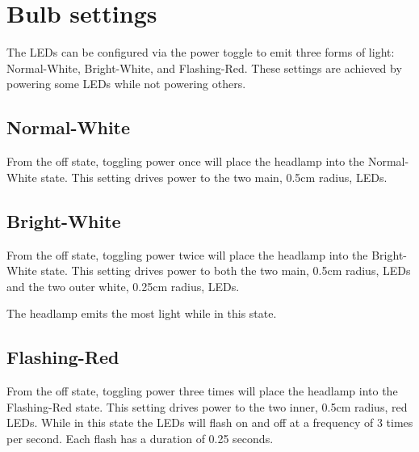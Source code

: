 \documentclass[12pt]{article}
\begin{document}
\section{Bulb settings}
The LEDs can be configured via the power toggle to emit three forms of light: Normal-White,
Bright-White, and Flashing-Red. These settings are achieved by powering some LEDs while not
powering others.

\subsection{Normal-White}
From the off state, toggling power once will place the headlamp into the Normal-White state.  This
setting drives power to the two main, 0.5cm radius, LEDs.

\subsection{Bright-White}
From the off state, toggling power twice will place the headlamp into the Bright-White state.  This
setting drives power to both the two main, 0.5cm radius, LEDs and the two outer white, 0.25cm radius, LEDs.

The headlamp emits the most light while in this state.

\subsection{Flashing-Red}
From the off state, toggling power three times will place the headlamp into the Flashing-Red state.
This setting drives power to the two inner, 0.5cm radius, red LEDs. While in this state the
LEDs will flash on and off at a frequency of 3 times per second. Each flash has a duration of
0.25 seconds.
\end{document}
